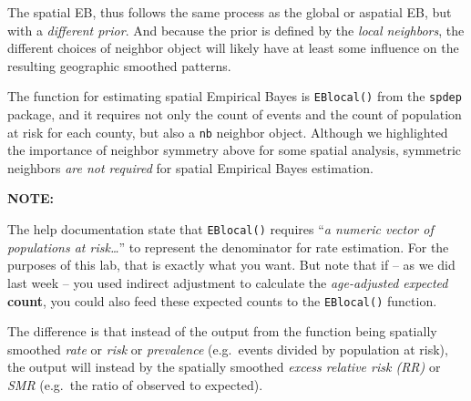 \documentclass[
]{book}
\newenvironment{Shaded}{\begin{snugshade}}{\end{snugshade}}
\newcommand{\AttributeTok}[1]{\textcolor[rgb]{0.77,0.63,0.00}{#1}}
\newcommand{\CommentTok}[1]{\textcolor[rgb]{0.56,0.35,0.01}{\textit{#1}}}
\newcommand{\DecValTok}[1]{\textcolor[rgb]{0.00,0.00,0.81}{#1}}
\newcommand{\FunctionTok}[1]{\textcolor[rgb]{0.00,0.00,0.00}{#1}}
\newcommand{\NormalTok}[1]{#1}
\newcommand{\OtherTok}[1]{\textcolor[rgb]{0.56,0.35,0.01}{#1}}
\newcommand{\SpecialCharTok}[1]{\textcolor[rgb]{0.00,0.00,0.00}{#1}}
\newenvironment{rmdnote}[1]
  {
  \begin{itemize}
  \renewcommand{\labelitemi}{
    \raisebox{-.7\height}[0pt][0pt]{
      {\setkeys{Gin}{width=3em,keepaspectratio}\texttt{[image: images/\#1]}}
    }
  }
  \setlength{\fboxsep}{1em}
  \begin{note}
  \item
  }
  {
  \end{note}
  \end{itemize}
  }
\begin{document}
The spatial EB, thus follows the same process as the global or aspatial EB, but with a \emph{different prior}. And because the prior is defined by the \emph{local neighbors}, the different choices of neighbor object will likely have at least some influence on the resulting geographic smoothed patterns.

The function for estimating spatial Empirical Bayes is \texttt{EBlocal()} from the \texttt{spdep} package, and it requires not only the count of events and the count of population at risk for each county, but also a \texttt{nb} neighbor object. Although we highlighted the importance of neighbor symmetry above for some spatial analysis, symmetric neighbors \emph{are not required} for spatial Empirical Bayes estimation.

\begin{rmdnote}{note}
\textbf{NOTE:}

The help documentation state that \texttt{EBlocal()} requires ``\emph{a numeric vector of populations at risk\ldots{}}'' to represent the denominator for rate estimation. For the purposes of this lab, that is exactly what you want. But note that if -- as we did last week -- you used indirect adjustment to calculate the \emph{age-adjusted expected} \textbf{count}, you could also feed these expected counts to the \texttt{EBlocal()} function.

The difference is that instead of the output from the function being spatially smoothed \emph{rate} or \emph{risk} or \emph{prevalence} (e.g.~events divided by population at risk), the output will instead by the spatially smoothed \emph{excess relative risk (RR)} or \emph{SMR} (e.g.~the ratio of observed to expected).

\end{rmdnote}

\begin{Shaded}
\end{Shaded}
\end{document}
